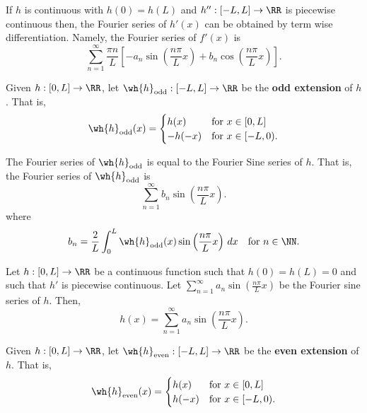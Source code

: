 \documentclass[12pt, a4paper]{article}
\begin{document}
\begin{corollary}
    If \(h\) is continuous with \(h(0)=h(L)\) and \(h'':[-L,L] \to \RR\) is piecewise continuous then, the Fourier series of \(h'(x)\) can be obtained by term wise differentiation. Namely, the Fourier series of \(f'(x)\) is 
    \[\sum_{n=1}^{\infty} \frac{\pi n}{L} \left[ -a_n \sin\left( \frac{n\pi}{L}x \right)+b_n \cos\left( \frac{n\pi}{L}x \right)\right].\]
\end{corollary}

\begin{definition}
    Given \(h:[0,L] \to \RR\), let \(\wh{h}_{\text{odd}}:[-L,L] \to \RR\) be the \textbf{odd extension} of \(h\). That is, 
    \[\wh{h}_{\text{odd}}(x) =\begin{cases}
        h(x) & \text{for } x \in [0,L] \\
        -h(-x) & \text{for } x \in [-L,0).
    \end{cases}\]
\end{definition}

\begin{proposition}
    The Fourier series of \(\wh{h}_{\text{odd}}\) is equal to the Fourier Sine series of \(h\). That is, the Fourier series of \(\wh{h}_{\text{odd}}\) is 
    \[\sum_{n=1}^{\infty} b_n \sin \left( \frac{n\pi}{L}x \right).\]
    where 
    \[b_n = \frac{2}{L} \int_0^L \wh{h}_{\text{odd}}(x)\sin \left( \frac{n\pi}{L}x \right) \, dx \quad \text{for } n \in \NN.\]
\end{proposition}

\begin{corollary}
    Let \(h : [0,L] \to \RR\) be a continuous function such that \(h(0)=h(L)=0\) and such that \(h'\) is piecewise continuous. Let \(\sum_{n=1}^{\infty} a_n \sin \left( \frac{n\pi}{L}x \right)\) be the Fourier sine series of \(h\). Then,
    \[h(x) =\sum_{n=1}^{\infty} a_n \sin \left( \frac{n\pi}{L}x \right).\]
\end{corollary}

\begin{definition}
    Given \(h:[0,L] \to \RR\), let \(\wh{h}_{\text{even}}:[-L,L] \to \RR\) be the \textbf{even extension} of \(h\). That is,
    \[\wh{h}_{\text{even}}(x) = \begin{cases}
        h(x) & \text{for } x \in [0,L] \\
        h(-x) & \text{for } x \in [-L,0).
    \end{cases}\]
\end{definition}
\end{document}
